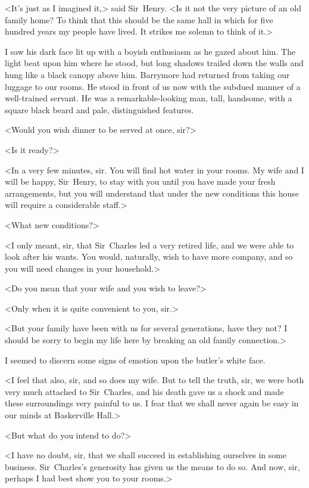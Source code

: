 <It's just as I imagined it,> said Sir~Henry. <Is it not the very picture of an old family home? To think that this should be the same hall in which for five hundred years my people have lived. It strikes me solemn to think of it.>

I saw his dark face lit up with a boyish enthusiasm as he gazed about him. The light beat upon him where he stood, but long shadows trailed down the walls and hung like a black canopy above him. Barrymore had returned from taking our luggage to our rooms. He stood in front of us now with the subdued manner of a well-trained servant. He was a remarkable-looking man, tall, handsome, with a square black beard and pale, distinguished features.

<Would you wish dinner to be served at once, sir?>

<Is it ready?>

<In a very few minutes, sir. You will find hot water in your rooms. My wife and I will be happy, Sir~Henry, to stay with you until you have made your fresh arrangements, but you will understand that under the new conditions this house will require a considerable staff.>



<What new conditions?>

<I only meant, sir, that Sir~Charles led a very retired life, and we were able to look after his wants. You would, naturally, wish to have more company, and so you will need changes in your household.>

<Do you mean that your wife and you wish to leave?>

<Only when it is quite convenient to you, sir.>

<But your family have been with us for several generations, have they not? I should be sorry to begin my life here by breaking an old family connection.>

I seemed to discern some signs of emotion upon the butler's white face.

<I feel that also, sir, and so does my wife. But to tell the truth, sir, we were both very much attached to Sir~Charles, and his death gave us a shock and made these surroundings very painful to us. I fear that we shall never again be easy in our minds at Baskerville Hall.>

<But what do you intend to do?>

<I have no doubt, sir, that we shall succeed in establishing our\-selves in some business. Sir~Charles's generosity has given us the means to do so. And now, sir, perhaps I had best show you to your rooms.>

